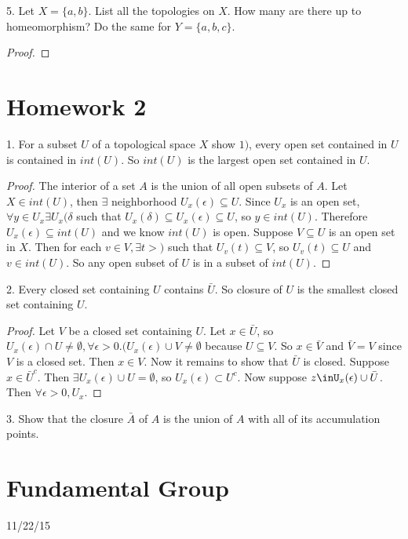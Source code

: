 \documentclass{amsart}
\begin{document}
5. Let $X=\{a, b\}$. List all the topologies on $X$. How many are there up to homeomorphism? Do the same for $Y=\{a, b, c\}$. 

\begin{proof}
\end{proof}

\section{Homework 2}

1. For a subset $U$ of a topological space $X$ show $1)$, every open set contained in $U$ is contained in $int(U)$. So $int(U)$ is the largest open set contained in $U$. 

\begin{proof}
The interior of a set $A$ is the union of all open subsets of $A$. Let $X\in int(U)$, then $\exists$ neighborhood $U_x(\epsilon)\subseteq U$. Since $U_x$ is an open set, $\forall y\in U_x \exists U_x(\delta$ such that $U_x(\delta)\subseteq U_x(\epsilon)\subseteq U$, so $y\in int(U)$. Therefore $U_x(\epsilon)\subseteq int(U)$ and we know $int(U)$ is open. Suppose $V\subseteq U$ is an open set in $X$. Then for each $v\in V, \exists t>)$ such that $U_v(t)\subseteq V$, so $U_v(t)\subseteq U$ and $v\in int(U).$ So any open subset of $U$ is in a subset of $int(U). $ 

\end{proof}

2. Every closed set containing $U$ contains $\bar{U}$. So closure of $U$ is the smallest closed set containing $U$. 
\begin{proof}
Let $V$ be a closed set containing $U$. Let $x\in \bar{U}$, so $U_x(\epsilon)\cap U \neq \emptyset, \forall \epsilon >0. (U_x(\epsilon)\cup V \neq \emptyset$ because $U\subseteq V$. So $x\in \bar{V}$ and $\bar{V}=V$ since $V$ is a closed set. Then $x\in V$. Now it remains to show that $\bar{U}$ is closed. Suppose $x\in\bar{U}^c.$ Then $\exists U_x(\epsilon) \cup U = \emptyset$, so $U_x(\epsilon) \subset U^c$. Now suppose $z\inU_x(\epsilon)\cup \bar{U}$. Then $\forall\epsilon>0, U_x$. 
\end{proof}

3. Show that the closure $\bar{A}$ of $A$ is the union of $A$ with all of its accumulation points. 

\section{Fundamental Group} 
11/22/15
\end{document}
